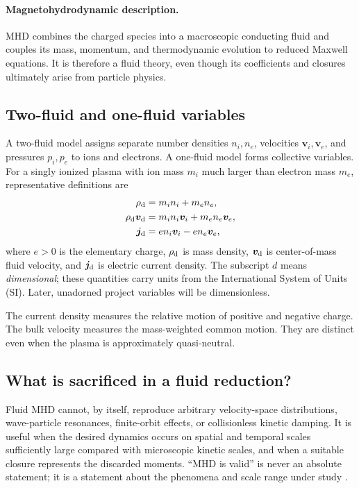 \documentclass[11pt]{article}
\newcommand{\vect}[1]{\bm{#1}}
\begin{document}
\paragraph{Magnetohydrodynamic description.}
MHD combines the charged species into a macroscopic conducting fluid and couples its mass, momentum, and thermodynamic evolution to reduced Maxwell equations. It is therefore a fluid theory, even though its coefficients and closures ultimately arise from particle physics.

\subsection{Two-fluid and one-fluid variables}

A two-fluid model assigns separate number densities $n_i,n_e$, velocities $\vect{v}_i,\vect{v}_e$, and pressures $p_i,p_e$ to ions and electrons. A one-fluid model forms collective variables. For a singly ionized plasma with ion mass $m_i$ much larger than electron mass $m_e$, representative definitions are
\begin{align}
\rho_{\rm d}&=m_i n_i+m_e n_e,\\
\rho_{\rm d}\vect{v}_{\rm d}&=m_i n_i\vect{v}_i+m_e n_e\vect{v}_e,\\
\vect{j}_{\rm d}&=e n_i\vect{v}_i-e n_e\vect{v}_e,
\end{align}
where $e>0$ is the elementary charge, $\rho_{\rm d}$ is mass density, $\vect{v}_{\rm d}$ is center-of-mass fluid velocity, and $\vect{j}_{\rm d}$ is electric current density. The subscript $d$ means \emph{dimensional}; these quantities carry units from the International System of Units (SI). Later, unadorned project variables will be dimensionless.

The current density measures the relative motion of positive and negative charge. The bulk velocity measures the mass-weighted common motion. They are distinct even when the plasma is approximately quasi-neutral.

\subsection{What is sacrificed in a fluid reduction?}

Fluid MHD cannot, by itself, reproduce arbitrary velocity-space distributions, wave-particle resonances, finite-orbit effects, or collisionless kinetic damping. It is useful when the desired dynamics occurs on spatial and temporal scales sufficiently large compared with microscopic kinetic scales, and when a suitable closure represents the discarded moments. ``MHD is valid'' is never an absolute statement; it is a statement about the phenomena and scale range under study \cite{Goedbloed2004}.
\end{document}
